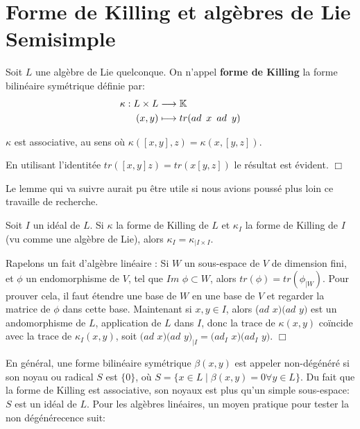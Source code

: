 \documentclass[a4paper,openany,12pt]{report}
\newcommand{\KK}{\mathbb{K}}
\theoremstyle{break}
{\theorembodyfont{\upshape}
\newtheorem*{rmq}{Remarque :}
\newtheorem*{prv}{Preuve :}
\newtheorem*{ex}{Exemples :}
\newtheorem*{exe}{Exemple : }
\newtheorem*{nota}{Notation :}
\newtheorem*{dem}{D\'emonstration :}}
\begin{document}
\chapter{Forme de Killing et algèbres de Lie Semisimple}

\begin{df}
\quad Soit $L$ une algèbre de Lie quelconque. On n'appel \textbf{forme de Killing} la forme bilinéaire symétrique définie par:
\begin{align*}
\kappa : L \times L & \longrightarrow \KK \\
(x,y) & \longmapsto tr(ad \enskip x \enskip ad \enskip y)
\end{align*}
\end{df}

\begin{prop}
\quad $\kappa$ est associative, au sens où $\kappa([x,y],z)=\kappa(x,[y,z])$.
\end{prop}

\begin{prv}
En utilisant l'identitée $tr([x,y]z)=tr(x[y,z])$ le résultat est évident. $\Box$
\end{prv}

Le lemme qui va suivre aurait pu être utile si nous avions poussé plus loin ce travaille de recherche. 

\begin{lem}
\quad Soit $I$ un idéal de $L$. Si $\kappa$ la forme de Killing de $L$ et $\kappa_I$ la forme de Killing de $I$ (vu comme une algèbre de Lie), alors $\kappa_I = \kappa_{\mid I \times I}$.
\end{lem}

\begin{prv}
\quad Rapelons un fait d'algèbre linéaire : Si $W$ un sous-espace de $V$ de dimension fini, et $\phi$ un endomorphisme de $V$, tel que $Im$ $\phi \subset W$, alors $tr(\phi) = tr(\phi_{\mid W})$. Pour prouver cela, il faut étendre une base de $W$ en une base de $V$ et regarder la matrice de $\phi$ dans cette base. Maintenant si $x,y \in I$, alors ($ad$ $x)(ad$ $y)$ est un andomorphisme de $L$, application de $L$ dans $I$, donc la trace de $\kappa(x,y)$ coïncide avec la trace de $\kappa_{I}(x,y)$, soit $(ad$ $x)(ad$ $y)_{\mid I}=(ad_I$ $x)(ad_I$ $y)$. $\Box$
\end{prv}

\quad En général, une forme bilinéaire symétrique $\beta(x,y)$ est appeler non-dégénéré si son noyau ou radical $S$ est $\{0\}$, où $S = \{ x \in L \mid \beta(x,y)=0 \forall y \in L \}$. Du fait que la forme de Killing est associative, son noyaux est plus qu'un simple sous-espace: $S$ est un idéal de $L$. Pour les algèbres linéaires, un moyen pratique pour tester la non dégénérecence suit: 
\end{document}
